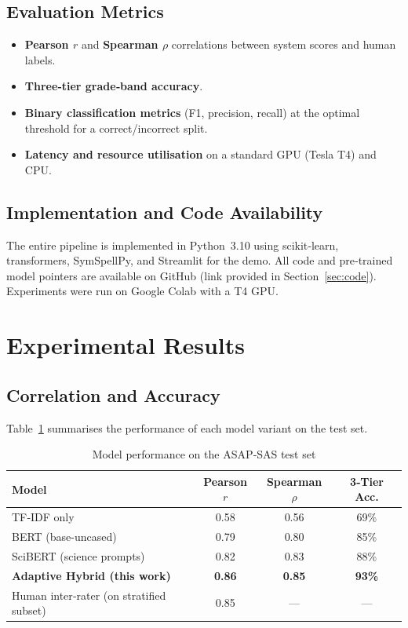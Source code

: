 \documentclass[11pt,a4paper]{article}
\begin{document}
\subsection{Evaluation Metrics}
\label{sec:metrics}
\begin{itemize}[noitemsep]
\item \textbf{Pearson $r$} and \textbf{Spearman $\rho$} correlations between system scores and human labels.
\item \textbf{Three‑tier grade‑band accuracy}.
\item \textbf{Binary classification metrics} (F1, precision, recall) at the optimal threshold for a correct/incorrect split.
\item \textbf{Latency and resource utilisation} on a standard GPU (Tesla T4) and CPU.
\end{itemize}

\subsection{Implementation and Code Availability}
\label{sec:implementation}
The entire pipeline is implemented in Python~3.10 using scikit‑learn, transformers, SymSpellPy, and Streamlit for the demo. All code and pre‑trained model pointers are available on GitHub (link provided in Section~\ref{sec:code}). Experiments were run on Google Colab with a T4 GPU.

\section{Experimental Results}
\label{sec:results}

\subsection{Correlation and Accuracy}
\label{sec:correlation}
Table~\ref{tab:results} summarises the performance of each model variant on the test set.

\begin{table}[H]
\centering
\caption{Model performance on the ASAP‑SAS test set}
\label{tab:results}
\begin{tabular}{lccc}
\toprule
\textbf{Model} & \textbf{Pearson $r$} & \textbf{Spearman $\rho$} & \textbf{3‑Tier Acc.} \\
\midrule
TF‑IDF only & 0.58 & 0.56 & 69\% \\
BERT (base-uncased) & 0.79 & 0.80 & 85\% \\
SciBERT (science prompts) & 0.82 & 0.83 & 88\% \\
\textbf{Adaptive Hybrid (this work)} & \textbf{0.86} & \textbf{0.85} & \textbf{93\%} \\
Human inter‑rater (on stratified subset) & 0.85 & --- & --- \\
\bottomrule
\end{tabular}
\end{table}
\end{document}
